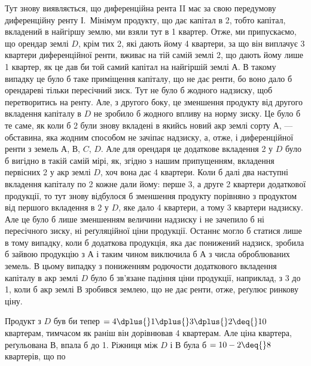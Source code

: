Тут знову виявляється, що диференційна рента II має за свою передумову
диференційну ренту І.~Мінімум продукту, що дає капітал в 2,
тобто капітал, вкладений в найгіршу землю, ми взяли тут в 1 квартер.
Отже, ми припускаємо, що орендар землі $D$, крім тих 2, які
дають йому 4 квартери, за що він виплачує 3 квартери диференційної ренти, вживає
на тій самій землі 2, що дають йому лише 1 квартер, як це дав
би той самий капітал на
найгіршій землі $А$. В такому випадку це було б таке приміщення капіталу,
що не дає ренти, бо воно дало б орендареві тільки пересічний зиск. Тут не
було б жодного надзиску, щоб перетворитись на ренту. Але, з другого боку, це
зменшення продукту від другого вкладення капіталу в $D$ не зробило б жодного
впливу на норму зиску. Це було б те саме, як коли б 2 були
знову вкладені в якийсь новий акр землі сорту $А$, — обставина, яка жодним способом
не зачіпає надзиску, а, отже, і диференційної ренти з земель $А$, $В$, $C$, $D$.
Але для орендаря це додаткове вкладення 2 у $D$ було б вигідно
в такій самій мірі, як, згідно з нашим припущенням, вкладення первісних
2 у акр землі $D$, хоч вона дає 4 квартери. Коли б далі два наступні
вкладення капіталу по 2 кожне дали йому: перше 3, а друге
2 квартери додаткової продукції, то тут знову відбулося б зменшення продукту
порівняно з продуктом від першого вкладення в 2 у $D$, яке
дало 4 квартери, а тому 3 квартери надзиску. Але це було б лише зменшенням
величини надзиску і не зачепило б ні пересічного зиску, ні реґуляційної ціни
продукції. Останнє могло б статися лише в тому випадку, коли б додаткова
продукція, яка дає понижений надзиск, зробила б зайвою продукцію з $А$ і таким
чином виключила б $А$ з числа оброблюваних земель. В цьому випадку
з пониженням родючости додаткового вкладення капіталу в акр землі $D$ було б
зв’язане падіння ціни продукції, наприклад, з 3 до 1,
коли б акр землі $В$ зробився землею, що не дає ренти, отже, реґулює ринкову ціну.

Продукт з $D$ був би тепер $= 4 \dplus{} 1 \dplus{} 3 \dplus{} 2 \deq{} 10$ квартерам, тимчасом
як раніш він дорівнював 4 квартерам. Але ціна квартера, реґульована $В$, впала б
до 1. Ріжниця між $D$ і $В$ була б $= 10 - 2 \deq{} 8$ квартерів, що по
\parbreak{}  %
